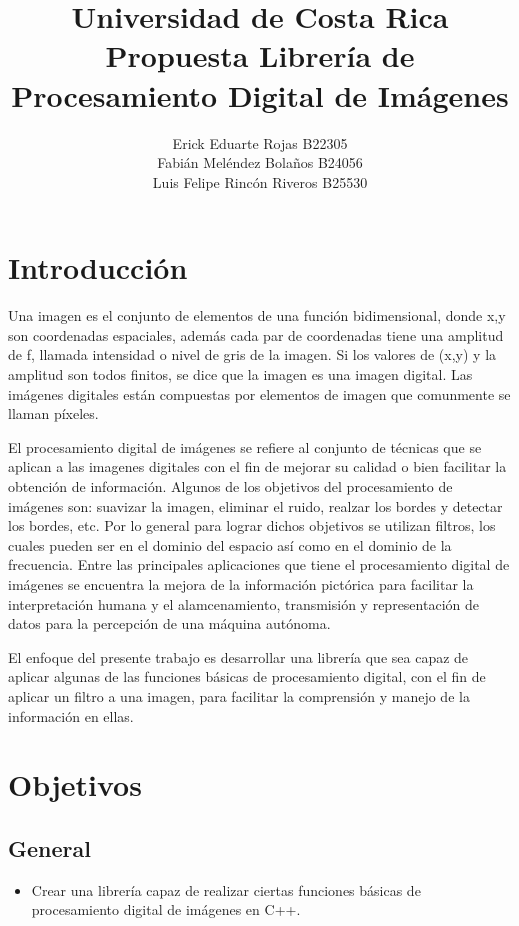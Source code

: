 \documentclass[letterpaper]{article}
\title{Universidad de Costa Rica \\ Propuesta Librería de Procesamiento Digital de Imágenes}
\author{Erick Eduarte Rojas B22305\\ Fabián Meléndez Bolaños B24056\\ Luis Felipe Rincón Riveros B25530}
\begin{document}
\maketitle

\section{Introducción}
Una imagen es el conjunto de elementos de una función bidimensional, donde x,y son coordenadas espaciales, además cada par de coordenadas tiene una amplitud de f, llamada intensidad o nivel de gris de la imagen. Si los valores de (x,y) y la amplitud son todos finitos, se dice que la imagen es una imagen digital. Las imágenes digitales están compuestas por elementos de imagen que comunmente se llaman píxeles.

El procesamiento digital de imágenes se refiere al conjunto de técnicas que se aplican a las imagenes digitales con el fin de mejorar su calidad o bien facilitar la obtención de información. Algunos de los objetivos del procesamiento de imágenes son: suavizar la imagen, eliminar el ruido, realzar los bordes y detectar los bordes, etc. Por lo general para lograr dichos objetivos se utilizan filtros, los cuales pueden ser en el dominio del espacio así como en el dominio de la frecuencia.
	Entre las principales aplicaciones que tiene el procesamiento digital de imágenes se encuentra la mejora de la información pictórica para facilitar la interpretación humana y el alamcenamiento, transmisión y representación de datos para la percepción de una máquina autónoma.
    
El enfoque del presente trabajo es desarrollar una librería que sea capaz de aplicar algunas de las funciones básicas de procesamiento digital, con el fin de aplicar un filtro a una imagen, para facilitar la comprensión y manejo de la información en ellas.

\section{Objetivos}

	\subsection{General}

		\begin{itemize}

		\item Crear una librería capaz de realizar ciertas funciones básicas de procesamiento digital de imágenes en C++.

		\end{itemize}
\end{document}
